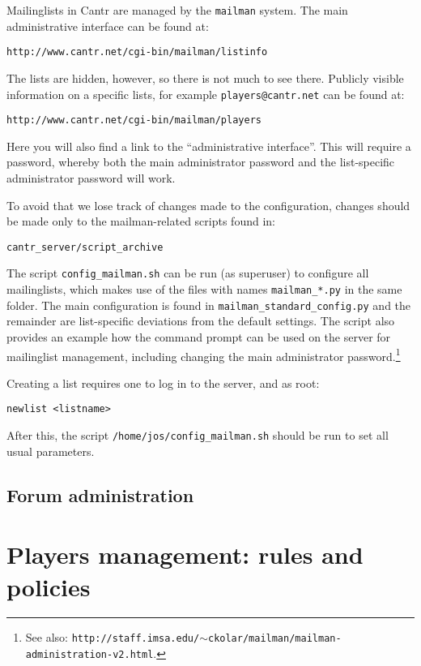 \documentclass[a4paper,12pt]{article}
\begin{document}
Mailinglists in Cantr are managed by the {\tt mailman} system. The main administrative interface can be found at:
\begin{verbatim}
http://www.cantr.net/cgi-bin/mailman/listinfo
\end{verbatim}
The lists are hidden, however, so there is not much to see there. Publicly visible information on a specific lists, for example {\tt players@cantr.net} can be found at:
\begin{verbatim}
http://www.cantr.net/cgi-bin/mailman/players
\end{verbatim}
Here you will also find a link to the ``administrative interface''. This will require a password, whereby both the main administrator password and the list-specific administrator password will work.

To avoid that we lose track of changes made to the configuration, changes should be made only to the mailman-related scripts found in:
\begin{verbatim}
cantr_server/script_archive
\end{verbatim}
The script {\tt config\_mailman.sh} can be run (as superuser) to configure all mailinglists, which makes use of the files with names {\tt mailman\_*.py} in the same folder. The main configuration is found in {\tt mailman\_standard\_config.py} and the remainder are list-specific deviations from the default settings. The script also provides an example how the command prompt can be used on the server for mailinglist management, including changing the main administrator password.\footnote{See also: {\tt http://staff.imsa.edu/$\sim$ckolar/mailman/mailman-administration-v2.html}.}

Creating a list requires one to log in to the server, and as root:
\begin{verbatim}
newlist <listname>
\end{verbatim}
After this, the script {\tt /home/jos/config\_mailman.sh} should be run to set all usual parameters.

\subsection{Forum administration}

\section{Players management: rules and policies}

\end{document}
